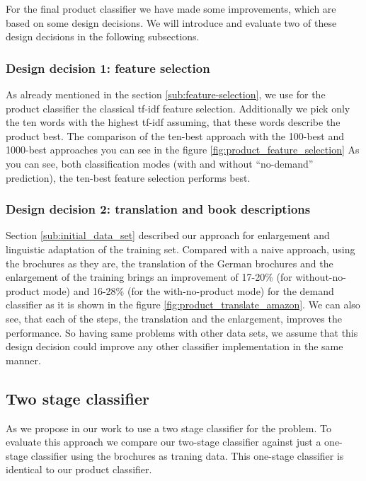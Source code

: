 For the final product classifier we have made some improvements, which are based on some design decisions.
We will introduce and evaluate two of these design decisions in the following subsections.

\subsubsection{Design decision 1: feature selection}
As already mentioned in the section \ref{sub:feature-selection}, we use for the product classifier the classical tf-idf feature selection.
Additionally we pick only the ten words with the highest tf-idf assuming, that these words describe the product best.
The comparison of the ten-best approach with the 100-best and 1000-best approaches you can see in the figure \ref{fig:product_feature_selection}
As you can see, both classification modes (with and without ``no-demand'' prediction), the ten-best feature selection performs best.

\subsubsection{Design decision 2: translation and book descriptions}
Section \ref{sub:initial_data_set} described our approach for enlargement and linguistic adaptation of the training set.
Compared with a naive approach, using the brochures as they are, the translation of the German brochures and the enlargement of the training brings an improvement of 17-20\% (for without-no-product mode) and 16-28\% (for the with-no-product mode) for the demand classifier as it is shown in the figure \ref{fig:product_translate_amazon}.
We can also see, that each of the steps, the translation and the enlargement, improves the performance.
So having same problems with other data sets, we assume that this design decision could improve any other classifier implementation in the same manner.

\subsection{Two stage classifier}
\label{sub:two_stage_classifier}

As we propose in our work to use a two stage classifier for the \nto problem.
To evaluate this approach we compare our two-stage classifier against just a one-stage classifier using the brochures as traning data.
This one-stage classifier is identical to our product classifier.

